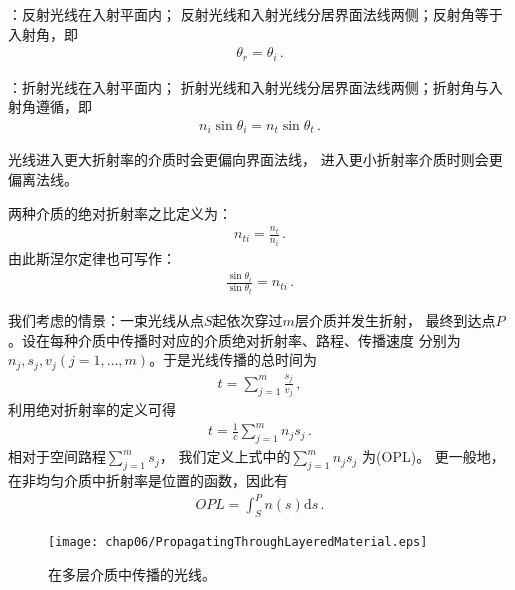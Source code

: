 \begin{proposition}
    ：反射光线在入射平面内；
    反射光线和入射光线分居界面法线两侧；反射角等于入射角，即
    \begin{align}
        \theta_r=\theta_i \, .
    \end{align}
\end{proposition}
\begin{proposition}
    ：折射光线在入射平面内；
    折射光线和入射光线分居界面法线两侧；折射角与入射角遵循，即
    \begin{align}
        n_i\sin\theta_i=n_t\sin\theta_t \, .
    \end{align}
\end{proposition}
\begin{corollary}
    光线进入更大折射率的介质时会更偏向界面法线，
    进入更小折射率介质时则会更偏离法线。
\end{corollary}
\begin{definition}
    两种介质的绝对折射率之比定义为：
    \begin{align}
        n_{ti}=\frac{n_t}{n_i}\, .
    \end{align}
    由此斯涅尔定律也可写作：
    \begin{align}
        \frac{\sin\theta_i}{\sin\theta_t}=n_{ti}\, .
    \end{align}
\end{definition}

我们考虑的情景：一束光线从点$S$起依次穿过$m$层介质并发生折射，
最终到达点$P$。设在每种介质中传播时对应的介质绝对折射率、路程、传播速度
分别为$n_j, s_j, v_j (j=1,\ldots,m)$。于是光线传播的总时间为
\begin{align}
    t=\sum\limits_{j=1}^{m}{\frac{s_j}{v_j}}\, ,
\end{align}
利用绝对折射率的定义可得
\begin{align}
    t=\frac{1}{c}\sum\limits_{j=1}^{m}{n_js_j}\, .
\end{align}
相对于空间路程$\sum\limits_{j=1}^{m}{s_j}$，
我们定义上式中的$\sum\limits_{j=1}^{m}{n_js_j}$
为(OPL)。
更一般地，在非均匀介质中折射率是位置的函数，因此有
\begin{align}
    OPL=\int_S^P {n(s)\mathrm{d}s}\, .
\end{align}
\begin{figure}[htbp]
    \centering\texttt{[image: chap06/PropagatingThroughLayeredMaterial.eps]}
    \caption{在多层介质中传播的光线。}
    \label{fig:6.27}
\end{figure}


